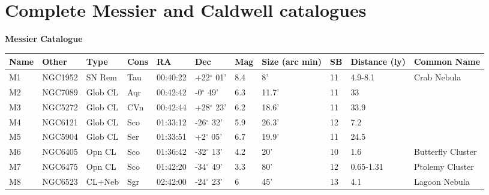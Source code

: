 \clearpage

\small
\noindent

\section{Complete Messier and Caldwell catalogues}
\vspace{4 mm}
\hspace{4 mm}
{\bf Messier Catalogue}
\begin{longtable}{@{}lllllllllll@{}}
\hline
{\bf Name} & {\bf Other} & {\bf Type} & {\bf Cons} & {\bf RA}  & {\bf Dec} & {\bf Mag} & {\bf Size (arc min)} & {\bf SB} & {\bf Distance (ly)} & {\bf Common Name}               \\
\hline
M1         & NGC1952     & SN Rem     & Tau       & 00:40:22 & +22$^{\circ}$ 01'  & 8.4       & 8'                   & 11       & 4.9-8.1             & Crab Nebula                               \\
M2         & NGC7089     & Glob CL    & Aqr       & 00:42:42 & -0$^{\circ}$ 49'   & 6.3       & 11.7'                & 11       & 33                  &                                           \\
M3         & NGC5272     & Glob CL    & CVn       & 00:42:44 & +28$^{\circ}$ 23'  & 6.2       & 18.6'                & 11       & 33.9                &                                           \\
M4         & NGC6121     & Glob CL    & Sco       & 01:33:12 & -26$^{\circ}$ 32'  & 5.9       & 26.3'                & 12       & 7.2                 &                                           \\
M5         & NGC5904     & Glob CL    & Ser       & 01:33:51 & +2$^{\circ}$ 05'   & 6.7       & 19.9'                & 11       & 24.5                &                                           \\
M6         & NGC6405     & Opn CL     & Sco       & 01:36:42 & -32$^{\circ}$ 13'  & 4.2       & 20'                  & 10       & 1.6                 & Butterfly Cluster                         \\
M7         & NGC6475     & Opn CL     & Sco       & 01:42:20 & -34$^{\circ}$ 49'  & 3.3       & 80'                  & 12       & 0.65-1.31           & Ptolemy Cluster                           \\
M8         & NGC6523     & CL+Neb     & Sgr       & 02:42:00 & -24$^{\circ}$ 23'  & 6         & 45'                  & 13       & 4.1                 & Lagoon Nebula                             \\

\end{longtable}
